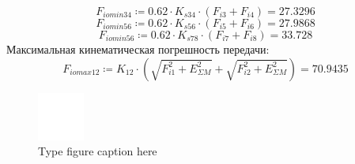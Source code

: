 \documentclass{article}
\newcommand{\defeq}{\coloneq} %
\begin{document}
\begin{equation*}
\textit{F}_{\textit{iomin34}} \defeq 0.62 \cdot \textit{K}_{\textit{s34}} \cdot \left( \textit{F}_{\textit{i3}}+\textit{F}_{\textit{i4}} \right) = {27.3296}
\end{equation*}
\begin{equation*}
\textit{F}_{\textit{iomin56}} \defeq 0.62 \cdot \textit{K}_{\textit{s56}} \cdot \left( \textit{F}_{\textit{i5}}+\textit{F}_{\textit{i6}} \right) = {27.9868}
\end{equation*}
\begin{equation*}
\textit{F}_{\textit{iomin56}} \defeq 0.62 \cdot \textit{K}_{\textit{s78}} \cdot \left( \textit{F}_{\textit{i7}}+\textit{F}_{\textit{i8}} \right) = {33.728}
\end{equation*}
\colorbox[HTML]{000000}{Максимальная кинематическая погрешность передачи:}\newline
\begin{equation*}
\textit{F}_{\textit{iomax12}} \defeq \textit{K}_{\textit{12}} \cdot \left( \sqrt{\textit{F}_{\textit{i1}}^{2}+E_{ΣM}^{2}}+\sqrt{\textit{F}_{\textit{i2}}^{2}+E_{ΣM}^{2}} \right) = {70.9435}
\end{equation*}
\begin{figure}[h!]
 \begin{center}
  \includegraphics[max width=\textwidth]{calculations/820.png}
  \caption{Type figure caption here}
  \label{fig:820}
 \end{center}
\end{figure}
\end{document}
